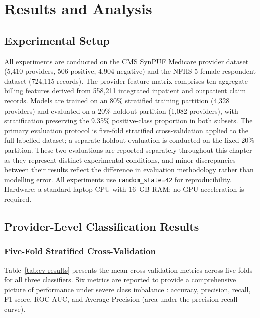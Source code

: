 \chapter{Results and Analysis}
\label{ch:results}

\section{Experimental Setup}
\label{sec:exp-setup}

All experiments are conducted on the CMS SynPUF Medicare provider dataset (5,410 providers, 506 positive, 4,904 negative) and the NFHS-5 female-respondent dataset (724,115 records). The provider feature matrix comprises ten aggregate billing features derived from 558,211 integrated inpatient and outpatient claim records. Models are trained on an 80\% stratified training partition (4,328 providers) and evaluated on a 20\% holdout partition (1,082 providers), with stratification preserving the 9.35\% positive-class proportion in both subsets. The primary evaluation protocol is five-fold stratified cross-validation applied to the full labelled dataset; a separate holdout evaluation is conducted on the fixed 20\% partition. These two evaluations are reported separately throughout this chapter as they represent distinct experimental conditions, and minor discrepancies between their results reflect the difference in evaluation methodology rather than modelling error. All experiments use \texttt{random\_state=42} for reproducibility. Hardware: a standard laptop CPU with 16~GB RAM; no GPU acceleration is required.

\section{Provider-Level Classification Results}
\label{sec:classification-results}

\subsection{Five-Fold Stratified Cross-Validation}

Table~\ref{tab:cv-results} presents the mean cross-validation metrics across five folds for all three classifiers. Six metrics are reported to provide a comprehensive picture of performance under severe class imbalance \cite{b4}\cite{b5}: accuracy, precision, recall, F1-score, ROC-AUC, and Average Precision (area under the precision-recall curve).

